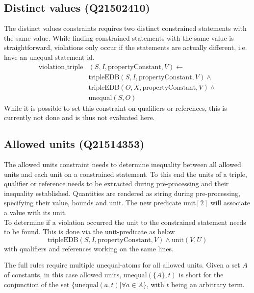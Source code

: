 \documentclass[hyperref,bachelorofscience,fleqn]{cgvpub}
\begin{document}
\subsection{Distinct values (Q21502410)}
The distinct values constraints requires two distinct constrained statements with the same value. 
While finding constrained statements with the same value is straightforward, violations only occur if the statements are actually different, i.e. have an unequal statement id.
\begin{equation*}
\begin{split}
\text{violation\_triple}&(S, I, \text{propertyConstant}, V) \leftarrow \\
&\text{tripleEDB}(S, I, \text{propertyConstant}, V) \wedge \\
&\text{tripleEDB}(O, X, \text{propertyConstant}, V) \wedge \\
&\text{unequal}(S, O)
\end{split}
\end{equation*}
While it is possible to set this constraint on qualifiers or references, this is currently not done and is thus not evaluated here.

\subsection{Allowed units (Q21514353)}\label{subsec_3_allowed_units}
The allowed units constraint needs to determine inequality between all allowed units and each unit on a constrained statement. To this end the units of a triple, qualifier or reference needs to be extracted during pre-processing and their inequality established. Quantities are rendered as string during pre-processing, specifying their value, bounds and unit. The new predicate unit\([2]\) will associate a value with its unit.\\

To determine if a violation occurred the unit to the constrained statement needs to be found. This is done via the unit-predicate as below
\begin{equation*}
\text{tripleEDB}(S, I, \text{propertyConstant}, V) \wedge \text{unit}(V, U)
\end{equation*}
with qualifiers and references working on the same lines.

The full rules require multiple unequal-atoms for all allowed units. Given a set \(A\) of constants, in this case allowed units, \(\text{unequal}(\{A\}, t)\) is short for the conjunction of the set \(\{\text{unequal}(a, t) | \forall a \in A\}\), with \(t\) being an arbitrary term.
\end{document}
